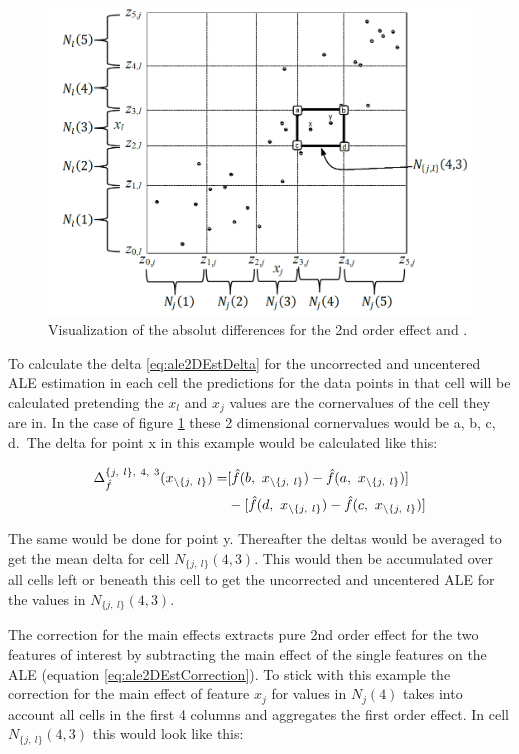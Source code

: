 \documentclass[
]{krantz}
\begin{document}
\begin{figure}
\includegraphics[width=1\linewidth]{images/ale_1_ALE_2D_estimation} \caption{Visualization of the absolut differences for the 2nd order effect \citep[page 13]{Apley2016} and \citep{molnar2019}.}\label{fig:ale2DEstimation}
\end{figure}



To calculate the delta \eqref{eq:ale2DEstDelta} for the uncorrected and uncentered ALE estimation in each cell the predictions for the data points in that cell will be calculated pretending the \(x_l\) and \(x_j\) values are the cornervalues of the cell they are in. In the case of figure \ref{fig:ale2DEstimation} these 2 dimensional cornervalues would be a, b, c, d.~The delta for point x in this example would be calculated like this:

\begin{align}
\Delta_{\hat f}^{{\{j,~l\}}, ~4,~3} (x_{\setminus\{j,~l\}}) = 
& [\hat f(b, ~x_{\setminus\{j,~l\}}) - \hat f(a, ~x_{\setminus\{j,~l\}})] \notag \\
&- [\hat f(d, ~x_{\setminus\{j,~l\}}) - \hat f(c, ~x_{\setminus\{j,~l\}})] \notag
\end{align}

The same would be done for point y. Thereafter the deltas would be averaged to get the mean delta for cell \(N_{\{j,~l\}}(4,3)\). This would then be accumulated over all cells left or beneath this cell to get the uncorrected and uncentered ALE for the values in \(N_{\{j,~l\}}(4,3)\).

The correction for the main effects extracts pure 2nd order effect for the two features of interest by subtracting the main effect of the single features on the ALE (equation \eqref{eq:ale2DEstCorrection}). To stick with this example the correction for the main effect of feature \(x_j\) for values in \(N_j(4)\) takes into account all cells in the first 4 columns and aggregates the first order effect. In cell \(N_{\{j,~l\}}(4,3)\) this would look like this:
\end{document}
